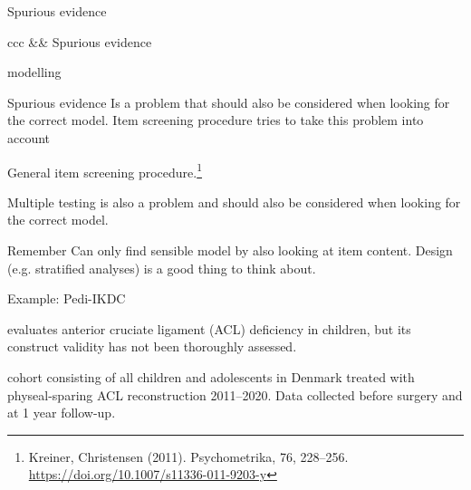 \documentclass[xcolor=table]{beamer}
\begin{document}
\begin{frame}{Spurious evidence}
\begin{tabular}{ccc}
&&
Spurious evidence
\end{tabular}
\end{frame}

\begin{frame}{modelling}

\begin{block}{Spurious evidence}
Is a problem that should also be considered when looking for the correct model. Item screening procedure tries to take this problem into account
\end{block}
General item screening procedure.\footnote{Kreiner, Christensen (2011). Psychometrika, 76, 228–256. \url{https://doi.org/10.1007/s11336-011-9203-y}}


\begin{block}{Multiple testing}
is also a problem and  should also be considered when looking for the correct model.
\end{block}

\begin{block}{Remember}
Can only find sensible model by also looking at item content. Design (e.g. stratified analyses) is a good thing to think about.
\end{block}
\end{frame}

\begin{frame}{Example: Pedi-IKDC}
\begin{block}{evaluates}
anterior cruciate ligament (ACL) deficiency in children, but its construct validity has not been thoroughly assessed.
\end{block} 
\pause
\begin{block}{cohort}
consisting of all children and adolescents in Denmark treated with physeal-sparing ACL reconstruction 2011–2020. Data collected before surgery and at 1 year follow-up.
\end{block}
\end{frame}
\end{document}
